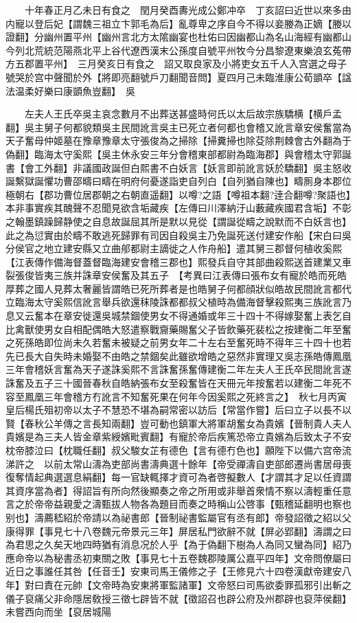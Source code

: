 　　十年春正月乙未日有食之　閏月癸酉夀光成公鄭冲卒　丁亥詔曰近世以來多由内寵以登后妃【謂魏三祖立卞郭毛為后】亂尊卑之序自今不得以妾媵為正嫡【媵以證翻】分幽州置平州【幽州言北方太隂幽宴也杜佑曰因幽都山為名山海經有幽都山今列北荒統范陽燕北平上谷代遼西漢末公孫度自號平州牧今分昌黎遼東樂浪玄菟帶方五郡置平州】　三月癸亥日有食之　詔又取良家及小將吏女五千人入宫選之母子號哭於宫中聲聞於外【將即亮翻號戶刀翻聞音問】夏四月己未臨淮康公荀顗卒【諡法温柔好樂曰康顗魚豈翻】　吳

　　左夫人王氏卒吳主哀念數月不出葬送甚盛時何氏以太后故宗族驕横【横戶孟翻】吳主舅子何都貌類吳主民間訛言吳主已死立者何都也會稽又訛言章安侯奮當為天子奮母仲姬墓在豫章豫章太守張俊為之掃除【掃糞掃也除芟除荆棘會古外翻為于偽翻】臨海太守奚熙【吳主休永安三年分會稽東部都尉為臨海郡】與會稽太守郭誕書【會工外翻】非議國政誕但白熙書不白妖言【妖言即前訛言妖於驕翻】吳主怒收誕繫獄誕懼功曹邵疇曰疇在明府何憂遂詣吏自列白【自列猶自陳也】疇厠身本郡位極朝右【郡功曹位居郡朝之右朝直遥翻】以噂?之語【噂祖本翻?逹合翻噂?聚語也】本非事實疾其醜聲不忍聞見欲含垢藏疾【左傳曰川澤納汙山藪藏疾國君含垢】不彰之翰墨鎮躁歸静使之自息故誕屈其所是默以見從【謂誕從疇之說默而不白妖言也】此之為愆實由於疇不敢逃死歸罪有司因自殺吳主乃免誕死送付建安作船【宋白曰吳分侯官之地立建安縣又立曲郍都尉主謫徙之人作舟船】遣其舅三郡督何植收奚熙【江表傳作備海督蓋督臨海建安會稽三郡也】熙發兵自守其部曲殺熙送首建業又車裂張俊皆夷三族并誅章安侯奮及其五子　【考異曰江表傳曰張布女有寵於皓而死皓厚葬之國人見葬太奢麗皆謂皓已死所葬者是也皓舅子何都顔狀似皓故民間訛言都代立臨海太守奚熙信訛言舉兵欲還秣陵誅都都叔父植時為備海督擊殺熙夷三族訛言乃息又云奮本在章安徙還吳城禁錮使男女不得通婚或年三十四十不得嫁娶奮上表乞自比禽獸使男女自相配偶皓大怒遣察戰齎藥賜奮父子皆飲藥死裴松之按建衡二年至奮之死孫皓即位尚未久若奮未被疑之前男女年二十左右至奮死時不得年三十四十也若先已長大自失時未婚娶不由皓之禁錮矣此雖欲增皓之惡然非實理又吳志孫皓傳鳳凰三年會稽妖言奮為天子遂誅奚熙不言誅奮孫奮傳建衡二年左夫人王氏卒民間訛言遂誅奮及五子三十國晉春秋自皓納張布女至殺奮皆在天冊元年按奮若以建衡二年死不容至鳳凰三年會稽方冇訛言不知奮死果在何年今因奚熙之死終言之】　秋七月丙寅皇后楊氏殂初帝以太子不慧恐不堪為嗣常密以訪后【常當作嘗】后曰立子以長不以賢【春秋公羊傳之言長知兩翻】豈可動也鎮軍大將軍胡奮女為貴嬪【晉制貴人夫人貴嬪是為三夫人皆金章紫綬嬪毗賓翻】有寵於帝后疾篤恐帝立貴嬪為后致太子不安枕帝膝泣曰【枕職任翻】叔父駿女芷有德色【言有德冇色也】願陛下以備六宫帝流涕許之　以前太常山濤為吏部尚書濤典選十餘年【帝受禪濤自吏部郎遷尚書居母喪復奪情起典選選息絹翻】每一官缺輒擇才資可為者啓擬數人【才謂其才足以任資謂其資序當為者】得詔旨有所向然後顯奏之帝之所用或非舉首衆情不察以濤輕重任意言之於帝帝益親愛之濤甄拔人物各為題目而奏之時稱山公啓事【甄稽延翻明也察也别也】濤薦嵇紹於帝請以為祕書郎【晉制祕書監屬官有丞有郎】帝發詔徵之紹以父康得罪【事見七十八卷魏元帝景元三年】屏居私門欲辭不就【屏必郢翻】濤謂之曰為君思之久矣天地四時猶有消息况於人乎【為于偽翻下樹為人為同又蠻為同】紹乃應命帝以為秘書丞初東關之敗【事見七十五卷魏郡陵厲公嘉平四年】文帝問僚屬曰近日之事誰任其咎【任音壬】安東司馬王儀修之子【王修見六十四卷漢獻帝建安八年】對曰責在元帥【文帝時為安東將軍監諸軍】文帝怒曰司馬欲委罪孤邪引出斬之儀子裒痛父非命隱居敎授三徵七辟皆不就【徵詔召也辟公府及州郡辟也裒萍侯翻】未嘗西向而坐【裒居城陽